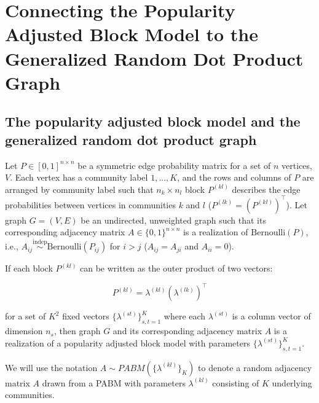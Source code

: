 \documentclass[12pt]{article}
\begin{document}
\hypertarget{connecting-the-popularity-adjusted-block-model-to-the-generalized-random-dot-product-graph}{%
\section{Connecting the Popularity Adjusted Block Model to the
Generalized Random Dot Product
Graph}\label{connecting-the-popularity-adjusted-block-model-to-the-generalized-random-dot-product-graph}}

\hypertarget{the-popularity-adjusted-block-model-and-the-generalized-random-dot-product-graph}{%
\subsection{The popularity adjusted block model and the generalized
random dot product
graph}\label{the-popularity-adjusted-block-model-and-the-generalized-random-dot-product-graph}}

\begin{definition}
\label{pabm}
Let $P \in [0, 1]^{n \times n}$ be a symmetric edge probability matrix for a 
set of $n$ 
vertices, $V$. Each vertex has a community label $1, ..., K$, and the rows and 
columns of $P$ are arranged by community label such that $n_k \times n_l$ block 
$P^{(kl)}$ describes the edge probabilities between vertices in communities 
$k$ and $l$ ($P^{(lk)} = (P^{(kl)})^\top$). 
Let graph $G = (V, E)$ be an undirected, unweighted graph such 
that its corresponding adjacency matrix $A \in \{0, 1\}^{n \times n}$ is a 
realization of $\text{Bernoulli}(P)$, i.e., 
$A_{ij} \stackrel{\text{indep}}{\sim}\text{Bernoulli}(P_{ij})$ for $i > j$ 
($A_{ij} = A_{ji}$ and $A_{ii} = 0$). 

If each block $P^{(kl)}$ can be written as the outer product of two vectors:

\begin{equation} \label{eq:pabm}
  P^{(kl)} = \lambda^{(kl)} (\lambda^{(lk)})^\top
\end{equation}

for a set of $K^2$ fixed vectors $\{\lambda^{(st)}\}_{s, t = 1}^K$ where each 
$\lambda^{(st)}$ is a column vector 
of dimension $n_s$, then graph $G$ and its corresponding adjacency matrix $A$ 
is a realization of a popularity adjusted block model with parameters 
$\{\lambda^{(st)}\}_{s, t = 1}^K$. 
\end{definition}

We will use the notation \(A \sim PABM(\{\lambda^{(kl)}\}_K)\) to denote
a random adjacency matrix \(A\) drawn from a PABM with parameters
\(\lambda^{(kl)}\) consisting of \(K\) underlying communities.
\end{document}
